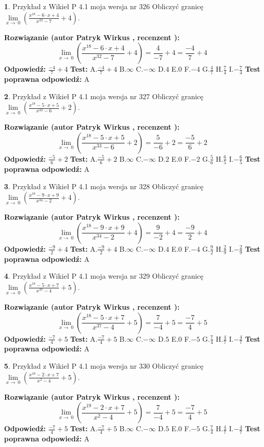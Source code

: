 \documentclass[12pt, a4paper]{article}
\theoremstyle{definition} %
\newtheorem{zad}{}
\newcommand{\zadStart}[1]{\begin{zad}#1\newline}
\newcommand{\zadStop}{\end{zad}}
\newcommand{\rozwStart}[2]{\noindent \textbf{Rozwiązanie (autor #1 , recenzent #2): }\newline}
\newcommand{\rozwStop}{\newline}
\newcommand{\odpStart}{\noindent \textbf{Odpowiedź:}\newline}
\newcommand{\odpStop}{\newline}
\newcommand{\testStart}{\noindent \textbf{Test:}\newline}
\newcommand{\testStop}{\newline}
\newcommand{\kluczStart}{\noindent \textbf{Test poprawna odpowiedź:}\newline}
\newcommand{\kluczStop}{\newline}
\begin{document}
\zadStart{Przykład z Wikieł P 4.1 moja wersja nr 326}
Obliczyć granicę $\lim\limits_{x\to\ 0}(\frac{x^{18}-6 \cdot x +4}{x^{32}-7}+4)$.
\zadStop
\rozwStart{Patryk Wirkus}{}
$$\lim\limits_{x\to\ 0}(\frac{x^{18}-6 \cdot x +4}{x^{32}-7}+4)=\frac{4}{-7}+4=\frac{-4}{7}+4$$
\rozwStop
\odpStart
$\frac{-4}{7}+4$
\odpStop
\testStart
A.$\frac{-4}{7}+4$
B.$\infty$
C.$-\infty$
D.$4$
E.$0$
F.$-4$
G.$\frac{4}{7}$
H.$\frac{7}{4}$
I.$-\frac{7}{4}$
\testStop
\kluczStart
A
\kluczStop



\zadStart{Przykład z Wikieł P 4.1 moja wersja nr 327}
Obliczyć granicę $\lim\limits_{x\to\ 0}(\frac{x^{18}-5 \cdot x +5}{x^{33}-6}+2)$.
\zadStop
\rozwStart{Patryk Wirkus}{}
$$\lim\limits_{x\to\ 0}(\frac{x^{18}-5 \cdot x +5}{x^{33}-6}+2)=\frac{5}{-6}+2=\frac{-5}{6}+2$$
\rozwStop
\odpStart
$\frac{-5}{6}+2$
\odpStop
\testStart
A.$\frac{-5}{6}+2$
B.$\infty$
C.$-\infty$
D.$2$
E.$0$
F.$-2$
G.$\frac{5}{6}$
H.$\frac{6}{5}$
I.$-\frac{6}{5}$
\testStop
\kluczStart
A
\kluczStop



\zadStart{Przykład z Wikieł P 4.1 moja wersja nr 328}
Obliczyć granicę $\lim\limits_{x\to\ 0}(\frac{x^{18}-9 \cdot x +9}{x^{34}-2}+4)$.
\zadStop
\rozwStart{Patryk Wirkus}{}
$$\lim\limits_{x\to\ 0}(\frac{x^{18}-9 \cdot x +9}{x^{34}-2}+4)=\frac{9}{-2}+4=\frac{-9}{2}+4$$
\rozwStop
\odpStart
$\frac{-9}{2}+4$
\odpStop
\testStart
A.$\frac{-9}{2}+4$
B.$\infty$
C.$-\infty$
D.$4$
E.$0$
F.$-4$
G.$\frac{9}{2}$
H.$\frac{2}{9}$
I.$-\frac{2}{9}$
\testStop
\kluczStart
A
\kluczStop



\zadStart{Przykład z Wikieł P 4.1 moja wersja nr 329}
Obliczyć granicę $\lim\limits_{x\to\ 0}(\frac{x^{18}-5 \cdot x +7}{x^{37}-4}+5)$.
\zadStop
\rozwStart{Patryk Wirkus}{}
$$\lim\limits_{x\to\ 0}(\frac{x^{18}-5 \cdot x +7}{x^{37}-4}+5)=\frac{7}{-4}+5=\frac{-7}{4}+5$$
\rozwStop
\odpStart
$\frac{-7}{4}+5$
\odpStop
\testStart
A.$\frac{-7}{4}+5$
B.$\infty$
C.$-\infty$
D.$5$
E.$0$
F.$-5$
G.$\frac{7}{4}$
H.$\frac{4}{7}$
I.$-\frac{4}{7}$
\testStop
\kluczStart
A
\kluczStop



\zadStart{Przykład z Wikieł P 4.1 moja wersja nr 330}
Obliczyć granicę $\lim\limits_{x\to\ 0}(\frac{x^{19}-2 \cdot x +7}{x^{2}-4}+5)$.
\zadStop
\rozwStart{Patryk Wirkus}{}
$$\lim\limits_{x\to\ 0}(\frac{x^{19}-2 \cdot x +7}{x^{2}-4}+5)=\frac{7}{-4}+5=\frac{-7}{4}+5$$
\rozwStop
\odpStart
$\frac{-7}{4}+5$
\odpStop
\testStart
A.$\frac{-7}{4}+5$
B.$\infty$
C.$-\infty$
D.$5$
E.$0$
F.$-5$
G.$\frac{7}{4}$
H.$\frac{4}{7}$
I.$-\frac{4}{7}$
\testStop
\kluczStart
A
\kluczStop
\end{document}
